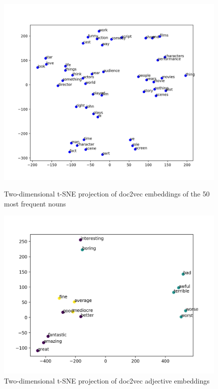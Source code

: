 \documentclass[12pt]{article}
\begin{document}
\begin{multicols}{2}
\begin{figure}[t]
    \centering
    \begin{minipage}{0.49\textwidth}
       \centering
       \includegraphics[width=1\textwidth]{figs/nouns.png}
       \caption{Two-dimensional t-SNE projection of doc2vec embeddings of the 50 most frequent nouns}
       \label{figure:nouns}
    \end{minipage}\hfill
    \begin{minipage}{0.49\textwidth}
       \centering
       \includegraphics[width=1\textwidth]{figs/sentiment.png}
       \caption{Two-dimensional t-SNE projection of doc2vec adjective embeddings}
       \label{figure:sentiments}
    \end{minipage}
\end{figure}


\end{multicols}
\end{document}
